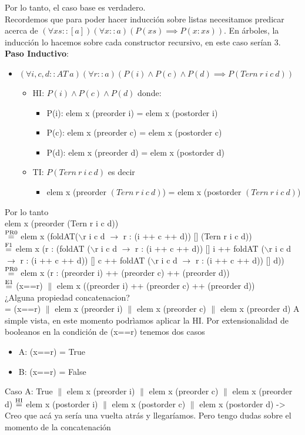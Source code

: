 \documentclass{article}
\begin{document}
Por lo tanto, el caso base es verdadero. \\
Recordemos que para poder hacer inducción sobre listas necesitamos predicar acerca de $(\forall xs::[a])(\forall x ::a) (P(xs) \implies P(x:xs))$. En árboles, la inducción lo hacemos sobre cada constructor recursivo, en este caso serían 3. \\
\textbf{Paso Inductivo}: 
\begin{itemize}
    \item $(\forall i, c, d:: AT \ a)(\forall r::a)(P(i) \land P(c) \land P(d) \implies P(Tern \ r \ i \ c \ d))$
    \begin{itemize}
        \item HI: $P(i) \land P(c) \land P(d)$ donde: 
        \begin{itemize}
            \item P(i): elem x (preorder i) = elem x (postorder i)
            \item P(c): elem x (preorder c) = elem x (postorder c)
            \item P(d): elem x (preorder d) = elem x (postorder d)
        \end{itemize}
        \item TI: $P(Tern \ r \ i \ c \ d)$ es decir
        \begin{itemize}
        \item elem x (preorder $(Tern \ r \ i \ c \ d)$) = elem x (postorder $(Tern \ r \ i \ c \ d)$)
        \end{itemize}
    \end{itemize}
\end{itemize}
Por lo tanto \\ 
elem x (preorder (Tern r i c d)) \\ 
$\stackrel{\text{PR0}}{=}$ elem x (foldAT($\backslash$r i c d $\rightarrow$ r : (i ++ c ++ d)) [] (Tern r i c d)) \\ 
$\stackrel{\text{F1}}{=}$ elem x (r : (foldAT ($\backslash$r i c d $\rightarrow$ r : (i ++ c ++ d)) [] i ++ foldAT ($\backslash$r i c d $\rightarrow$ r : (i ++ c ++ d)) [] c ++ foldAT ($\backslash$r i c d $\rightarrow$ r : (i ++ c ++ d)) [] d)) \\ 
$\stackrel{\text{PR0}}{=}$ elem x (r : (preorder i) ++ (preorder c) ++ (preorder d)) \\
$\stackrel{\text{E1}}{=}$ (x==r) $\|$ elem x ((preorder i) ++ (preorder c) ++ (preorder d)) \\
¿Alguna propiedad concatenacion? \\
= (x==r) $\|$ elem x (preorder i) $\|$ elem x (preorder c) $\|$ elem x (preorder d)
A simple vista, en este momento podrìamos aplicar la HI. Por extensionalidad de booleanos en la condición de (x==r) tenemos dos casos
\begin{itemize}
\item A: (x==r) = True 
\item B: (x==r) = False
\end{itemize}
Caso A: True $\|$ elem x (preorder i) $\|$ elem x (preorder c) $\|$ elem x (preorder d) $\stackrel{\text{HI}}{=}$ elem x (postorder i) $\|$ elem x (postorder c)  $\|$ elem x (postorder d) -> Creo que acá ya sería una vuelta atrás y llegaríamos. Pero tengo dudas sobre el momento de la concatenación
\end{document}
